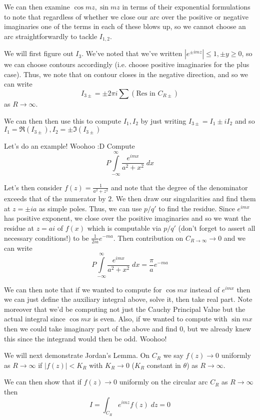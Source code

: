\documentclass[10pt]{report}
\newcommand{\abs}[1]{\left|#1\right|}
\begin{document}
We can then examine $\cos mz, \sin mz$ in terms of their exponential formulations to note that regardless of whether we close our arc over the positive or negative imaginaries one of the terms in each of these blows up, so we cannot choose an arc straightforwardly to tackle $I_{1,2}$. 

We will first figure out $I_3$. We've noted that we've written $\abs{e^{\pm imz}} \leq 1, \pm y \geq 0$, so we can choose contours accordingly (i.e. choose positive imaginaries for the plus case). Thus, we note that on contour closes in the negative direction, and so we can write
$$I_{3 \pm} = \pm 2\pi i\sum \left( \text{Res in } C_{R\pm} \right)$$
as $R \to \infty$. 

We can then then use this to compute $I_1, I_2$ by just writing $I_{3\pm} = I_1 \pm iI_2$ and so $I_1 = \Re (I_{3\pm}), I_2 = \pm\Im (I_{3\pm})$ 

Let's do an example! Woohoo :D Compute 
$$P\displaystyle\int\limits_{-\infty}^{\infty}\frac{e^{imx}}{a^2+x^2}\;dx$$

Let's then consider $f(z) = \frac{1}{a^2 + z^2}$ and note that the degree of the denominator exceeds that of the numerator by $2$. We then draw our singularities and find them at $z=\pm ia$ as simple poles. Thus, we can use $p/q'$ to find the residue. Since $e^{imx}$ has positive exponent, we close over the positive imaginaries and so we want the residue at $z=ai$ of $f(x)$ which is computable via $p/q'$ (don't forget to assert all necessary conditions!) to be $\frac{1}{2ia}e^{-ma}$. Then contribution on $C_{R \to \infty} \to 0$ and we can write
$$P\displaystyle\int\limits_{-\infty}^{\infty}\frac{e^{imx}}{a^2+x^2}\;dx = \frac{\pi}{a} e^{-ma}$$

We can then note that if we wanted to compute for $\cos mx$ instead of $e^{imx}$ then we can just define the auxiliary integral above, solve it, then take real part. Note moreover that we'd be computing not just the Cauchy Principal Value but the actual integral since $\cos mx$ is even. Also, if we wanted to compute with $\sin mx$ then we could take imaginary part of the above and find $0$, but we already knew this since the integrand would then be odd. Woohoo!

We will next demonstrate Jordan's Lemma. On $C_R$ we say $f(z) \to 0$ uniformly as $R \to \infty$ if $\abs{f(z)} < K_R$ with $K_R \to 0$ ($K_R$ constant in $\theta$) as $R \to \infty$. 

We can then show that if $f(z) \to 0$ uniformly on the circular arc $C_R$ as $R \to \infty$ then
$$I = \int_{C_R} e^{imz} f(z)\; dz = 0$$
\end{document}
